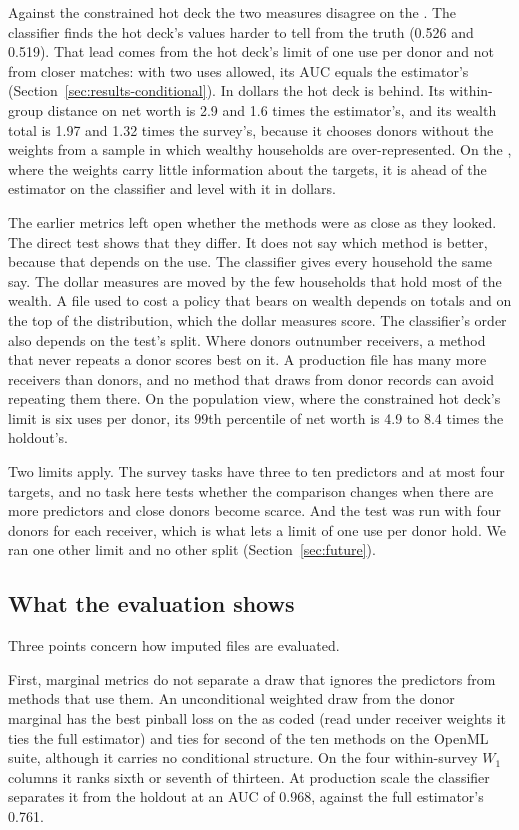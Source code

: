 Against the constrained hot deck the two measures disagree on the \scf{}.
The classifier finds the hot deck's values harder to tell from the truth
(0.526 and 0.519). That lead comes from the hot deck's limit of one use per
donor and not from closer matches: with two uses allowed, its AUC equals the
estimator's (Section~\ref{sec:results-conditional}). In dollars the hot deck
is behind. Its within-group
distance on net worth is 2.9 and 1.6 times the estimator's, and its wealth
total is 1.97 and 1.32 times the survey's, because it chooses donors without
the weights from a sample in which wealthy households are over-represented.
On the \cps{}, where the weights carry little information about the targets,
it is ahead of the estimator on the classifier and level with it in dollars.

The earlier metrics left open whether the methods were as close as they
looked. The direct test shows that they differ. It does not say which method
is better, because that depends on the use.
The classifier gives every household the same say. The dollar measures are
moved by the few households that hold most of the wealth. A file used to
cost a policy that bears on wealth depends on totals and on the top of the
distribution, which the dollar measures score. The classifier's order also
depends on the test's split. Where donors outnumber receivers, a method that
never repeats a donor scores best on it. A production file has many more
receivers than donors, and no method that draws from donor records can avoid
repeating them there. On the population view, where the constrained hot
deck's limit is six uses per donor, its 99th percentile of net worth is 4.9
to 8.4 times the holdout's.

Two limits apply. The survey tasks have three to ten predictors and at most
four targets, and no task here tests whether the comparison changes when
there are more predictors and close donors become scarce. And the test was
run with four donors for each receiver, which is what lets a limit of one
use per donor hold. We ran one other limit and no other split
(Section~\ref{sec:future}).

\subsection{What the evaluation shows}
\label{sec:discussion-evaluation}

Three points concern how imputed files are evaluated.

First, marginal metrics do not separate a draw that ignores the predictors
from methods that use them. An unconditional weighted draw from the donor
marginal has the best pinball loss on the \scf{} as coded (read under
receiver weights it ties the full estimator) and ties for second of the ten
methods on the OpenML suite, although it carries no conditional structure.
On the four within-survey $W_1$ columns it ranks sixth or seventh of
thirteen. At production scale the classifier separates it from the holdout
at an AUC of 0.968, against the full estimator's 0.761.

